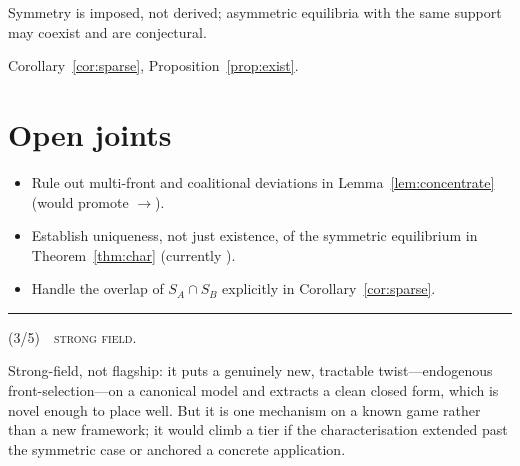 \documentclass[10pt,a4paper]{article}
\newcommand{\protorarity}{3}
\newcommand{\prototier}{strong field}
\newcommand{\protorarityrationale}{Strong-field, not flagship: it puts a genuinely
  new, tractable twist---endogenous front-selection---on a canonical model and
  extracts a clean closed form, which is novel enough to place well. But it is one
  mechanism on a known game rather than a new framework; it would climb a tier if
  the characterisation extended past the symmetric case or anchored a concrete
  application.}
\begin{document}
{\footnotesize\Risk Symmetry is imposed, not derived; asymmetric equilibria with
the same support may coexist and are conjectural.\par}

\Uses Corollary~\ref{cor:sparse}, Proposition~\ref{prop:exist}.

\section*{Open joints}
\begin{itemize}\setlength{\itemsep}{1pt}
  \item Rule out multi-front and coalitional deviations in
        Lemma~\ref{lem:concentrate} (would promote $\to$).
  \item Establish uniqueness, not just existence, of the symmetric equilibrium
        in Theorem~\ref{thm:char} (currently ).
  \item Handle the overlap of $S_A\cap S_B$ explicitly in
        Corollary~\ref{cor:sparse}.
\end{itemize}

\appendix




\bigskip\par\noindent\rule{\linewidth}{0.4pt}\par\smallskip
{}\quad
\rarity{\protorarity}\;(\protorarity/5)\ \textperiodcentered\ {\scshape\prototier}.\par
\smallskip
\noindent\protorarityrationale
\end{document}
